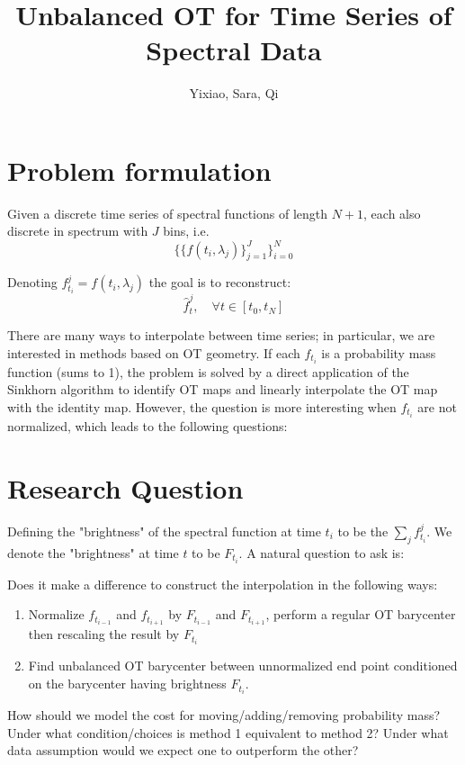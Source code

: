 \documentclass{article}
\title{Unbalanced OT for Time Series of Spectral Data}
\author{Yixiao, Sara, Qi}
\begin{document}
\maketitle

\section{Problem formulation}
Given a discrete time series of spectral functions of length $N+1$, each also discrete in spectrum with $J$ bins, i.e.
\begin{equation}
    \bigg\{ \Big\{f(t_i,\lambda_j)\Big\}_{j=1}^J\bigg\}_{i=0}^N
\end{equation}

Denoting $f_{t_i}^j = f(t_i,\lambda_j)$ the goal is to reconstruct:
\begin{equation}
    \hat{f}_t^j, \quad \forall t \in [t_0,t_N]
\end{equation}

There are many ways to interpolate between time series; in particular, we are interested in methods based on OT geometry. If each $f_{t_i}$ is a probability mass function (sums to 1), the problem is solved by a direct application of the Sinkhorn algorithm to identify OT maps and linearly interpolate the OT map with the identity map. However, the question is more interesting when $f_{t_i}$ are not normalized, which leads to the following questions:

\section{Research Question}
Defining the "brightness" of the spectral function at time $t_i$ to be the $\sum_{j} f_{t_i}^j$. We denote the "brightness" at time $t$ to be $F_{t_i}$. A natural question to ask is: 

Does it make a difference to construct the interpolation in the following ways:
\begin{enumerate}
    \item Normalize $f_{t_{i-1}}$ and $f_{t_{i+1}}$ by $F_{t_{i-1}}$ and $F_{t_{i+1}}$, perform a regular OT barycenter then rescaling the result by $F_{t_i}$
    \item Find unbalanced OT barycenter between unnormalized end point conditioned on the barycenter having brightness $F_{t_i}$.
\end{enumerate}

How should we model the cost for moving/adding/removing probability mass? Under what condition/choices is method 1 equivalent to method 2? Under what data assumption would we expect one to outperform the other?
\end{document}
